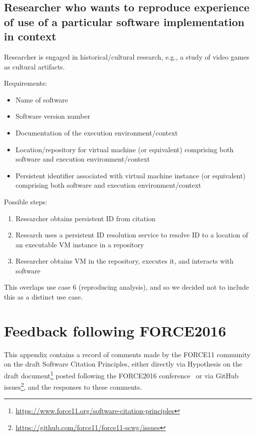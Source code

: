 \documentclass[12pt, oneside]{amsart}
\begin{document}
\subsection*{Researcher who wants to reproduce experience of use of a particular software implementation in context}

Researcher is engaged in historical/cultural research, e.g., a study of video games as cultural artifacts.

Requirements:
\begin{itemize}
\item Name of software
\item Software version number
\item Documentation of the execution environment/context
\item Location/repository for virtual machine (or equivalent) comprising both software and execution environment/context
\item Persistent identifier associated with virtual machine instance (or equivalent) comprising both software and execution environment/context
\end{itemize}

Possible steps:
\begin{enumerate}
\item Researcher obtains persistent ID from citation
\item Research uses a persistent ID resolution service to resolve ID to a location of  an executable VM instance in a repository
\item Researcher obtains VM in the repository, executes it, and interacts with software
\end{enumerate}

This overlaps use case 6 (reproducing analysis), and so we decided not to
include this as a distinct use case.

\section{Feedback following FORCE2016}
\label{app:force16-feedback}

This appendix contains a record of comments made by the FORCE11 community on the draft Software Citation Principles, either directly via Hypothesis on the draft document\footnote{\url{https://www.force11.org/software-citation-principles}} posted following the FORCE2016 conference~\cite{force2016} or via GitHub issues\footnote{\url{https://github.com/force11/force11-scwg/issues}}, and the responses to these comments.
\end{document}
